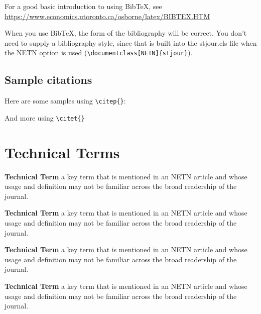 \documentclass[NETN,manuscript]{stjour-new}
\begin{document}
For a good basic introduction to using BibTeX, see\\
\href{https://www.economics.utoronto.ca/osborne/latex/BIBTEX.HTM}
{https://www.economics.utoronto.ca/osborne/latex/BIBTEX.HTM}

When you use BibTeX, the form of the bibliography will be correct. You
don't need to supply a bibliography style, since that is built into
the stjour.cls file when the NETN option is used
(\verb+\documentclass[NETN]{stjour}+).



\newpage
\subsection{Sample citations}

Here are some samples using \verb+\citep{}+:\\
\citep{bullmore2009complex,
gomez2009analysis,
rubinov2011weight,
power2014methods,
sporns2015modular,
scheeringa2012eeg,
fortunato2007resolution,
reichardt2006statistical,
smith2009correspondence,
sporns2011networks,
liegeois2014cerebral}

And more using \verb+\citet{}+\\
\citet{allen2012tracking,
calhoun2014chronnectome,
liu2013time,
fisher1915frequency,
gonzalez2014spatial,
damaraju2014dynamic,
hutchison2013resting,
de2012cortical,
tagliazucchi2012dynamic,
nooner2012nki}

\newpage



\section{Technical Terms}

\textbf{Technical Term} a key term that is mentioned in an NETN article and whose usage and definition may not be familiar across the broad readership of the journal. 

\textbf{Technical Term} a key term that is mentioned in an NETN article and whose usage and definition may not be familiar across the broad readership of the journal. 

\textbf{Technical Term} a key term that is mentioned in an NETN article and whose usage and definition may not be familiar across the broad readership of the journal. 

\textbf{Technical Term} a key term that is mentioned in an NETN article and whose usage and definition may not be familiar across the broad readership of the journal. 


\end{document}
